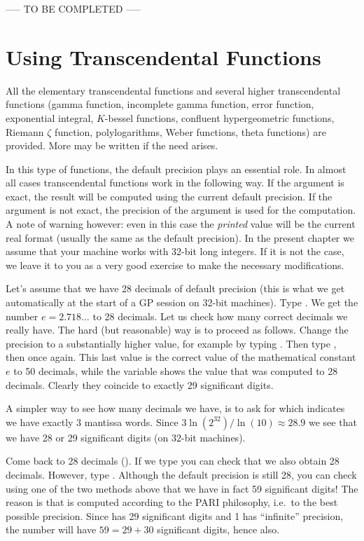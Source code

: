 ----- TO BE COMPLETED -----



\section{Using Transcendental Functions}

All the elementary transcendental functions and several higher transcendental
functions (gam\-ma function, incomplete gamma function, error function,
exponential integral, $K$-bessel functions, confluent hypergeometric functions,
Riemann $\zeta$ function, polylogarithms, Weber functions, theta functions)
are provided. More may be written if the need arises.

In this type of functions, the default precision plays an essential role.
In almost all cases transcendental functions work in the following way.
If the argument is exact, the result will be computed using the current
default precision. If the argument is not exact, the precision of the
argument is used for the computation. A note of warning however: even in this
case the {\it printed\/} value will be the current real format (usually the
same as the default precision). In the present chapter we assume that your
machine works with 32-bit long integers. If it is not the case, we leave it
to you as a very good exercise to make the necessary modifications.

Let's assume that we have 28 decimals of default precision (this is what we
get automatically at the start of a GP session on 32-bit machines). Type
. We get the number $e=2.718\dots$ to 28 decimals. Let us check
how many correct decimals we really have. The hard (but reasonable) way is to
proceed as follows. Change the precision to a substantially higher value, for
example by typing . Then type , then  once
again. This last value is the correct value of the mathematical constant $e$ to
50 decimals, while the variable  shows the value that was computed to 28
decimals. Clearly they coincide to exactly 29 significant digits.

A simpler way to see how many decimals we have, is to ask for 
which indicates we have exactly $3$ mantissa words. Since
$3\ln(2^{32}) / \ln(10)\approx28.9$ we see that we have 28 or 29 significant
digits (on 32-bit machines).

\smallskip
Come back to 28 decimals (). If we type 
you can check that we also obtain 28 decimals. However, type
. Although the default precision is still 28,
you can check using one of the two methods above that we have in fact 59
significant digits! The reason is that  is computed
according to the PARI philosophy, i.e.~to the best possible precision. Since
 has 29 significant digits and 1 has ``infinite'' precision, the
number  will have $59=29+30$ significant digits,
hence  also.

